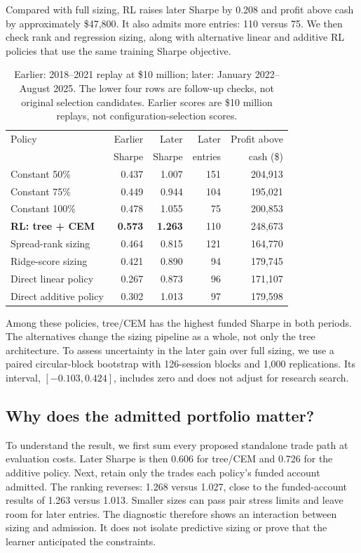 \documentclass[11pt,letterpaper]{article}
\newcommand{\money}[1]{\$#1}
\begin{document}
Compared with full sizing, RL raises later Sharpe by 0.208 and profit above
cash by approximately \money{47,800}. It also admits more entries: 110 versus
75. We then check rank and regression sizing, along with alternative linear
and additive RL policies that use the same training Sharpe objective.
\begin{table}[H]
\centering\small
\begin{tabular}{lrrrr}
\toprule
Policy & Earlier & Later & Later & Profit above\\
 & Sharpe & Sharpe & entries & cash (\$)\\
\midrule
Constant 50\% & 0.437 & 1.007 & 151 & 204,913\\
Constant 75\% & 0.449 & 0.944 & 104 & 195,021\\
Constant 100\% & 0.478 & 1.055 & 75 & 200,853\\
\textbf{RL: tree + CEM} & \textbf{0.573} & \textbf{1.263} & 110 & 248,673\\
\midrule
Spread-rank sizing & 0.464 & 0.815 & 121 & 164,770\\
Ridge-score sizing & 0.421 & 0.890 & 94 & 179,745\\
Direct linear policy & 0.267 & 0.873 & 96 & 171,107\\
Direct additive policy & 0.302 & 1.013 & 97 & 179,598\\
\bottomrule
\end{tabular}
\caption{Earlier: 2018--2021 replay at \money{10 million}; later:
January 2022--August 2025. The lower four rows are follow-up checks, not
original selection candidates. Earlier scores are \money{10 million}
replays, not configuration-selection scores.}
\label{tab:main}
\end{table}

Among these policies, tree/CEM has the highest funded Sharpe in both periods.
The alternatives change the sizing pipeline as a whole, not only the tree
architecture. To assess uncertainty in the later gain over full sizing, we use
a paired circular-block bootstrap with 126-session blocks and 1,000 replications.
Its interval, $[-0.103,0.424]$, includes zero and does not adjust for research search.

\subsection{Why does the admitted portfolio matter?}
To understand the result, we first sum every proposed standalone trade path
at evaluation costs. Later Sharpe is then 0.606 for tree/CEM and 0.726 for
the additive policy. Next, retain only the trades each policy's funded account
admitted. The ranking reverses: 1.268 versus 1.027, close to the funded-account
results of 1.263 versus 1.013. Smaller sizes can pass pair stress limits and
leave room for later entries. The diagnostic therefore shows an interaction
between sizing and admission. It does not isolate predictive sizing or prove
that the learner anticipated the constraints.
\end{document}
